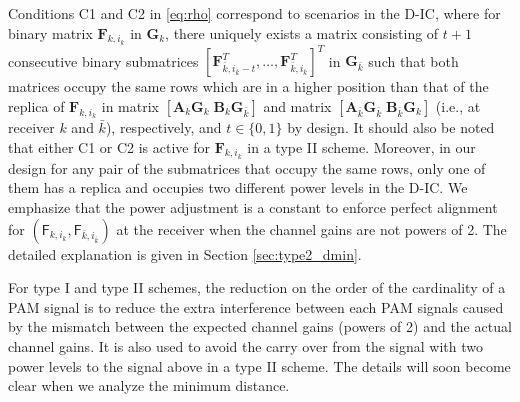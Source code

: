 \documentclass[12pt, draftclsnofoot, onecolumn]{IEEEtran}
\newcommand{\msf}[1]{\mathsf{#1}}
\theoremstyle{definition}
\begin{document}
Conditions C1 and C2 in \eqref{eq:rho} correspond to scenarios in the D-IC, where for binary matrix $\boldsymbol{F}_{k,i_{k}}$ in $\boldsymbol{G}_k$, there uniquely exists a matrix consisting of $t+1$ consecutive binary submatrices $[\boldsymbol{F}^T_{\bar{k},i_{\bar{k}}-t},\ldots,\boldsymbol{F}^T_{\bar{k},i_{\bar{k}}}]^T$ in $\boldsymbol{G}_{\bar{k}}$ such that both matrices occupy the same rows which are in a higher position than that of the replica of $\boldsymbol{F}_{k,i_{k}}$ in matrix $[\boldsymbol{A}_k\boldsymbol{G}_k \; \boldsymbol{B}_k\boldsymbol{G}_{\bar{k}}]$ and matrix $[\boldsymbol{A}_{\bar{k}}\boldsymbol{G}_{\bar{k}} \; \boldsymbol{B}_{\bar{k}}\boldsymbol{G}_k]$ (i.e., at receiver $k$ and $\bar{k}$), respectively, and $t\in \{0,1\}$ by design. It should also be noted that either C1 or C2 is active for $\boldsymbol{F}_{k,i_{k}}$ in a type II scheme. Moreover, in our design for any pair of the submatrices that occupy the same rows, only one of them has a replica and occupies two different power levels in the D-IC. We emphasize that the power adjustment is a constant to enforce perfect alignment for $(\msf{F}_{k,i_k},\msf{F}_{\bar{k},i_{\bar{k}}})$ at the receiver when the channel gains are not powers of 2. The detailed explanation is given in Section \ref{sec:type2_dmin}.




For type I and type II schemes, the reduction on the order of the cardinality of a PAM signal is to reduce the extra interference between each PAM signals caused by the mismatch between the expected channel gains (powers of 2) and the actual channel gains. It is also used to avoid the carry over from the signal with two power levels to the signal above in a type II scheme. The details will soon become clear when we analyze the minimum distance. %
\end{document}
